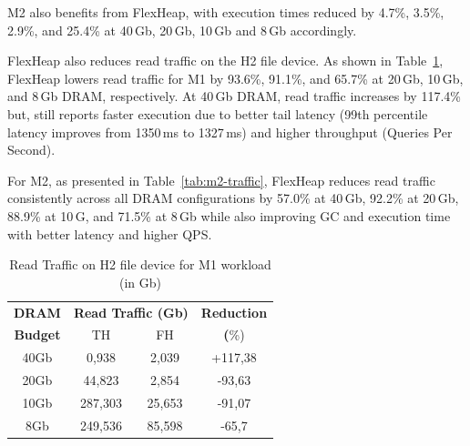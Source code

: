 M2 also benefits from FlexHeap, with execution times reduced 
by 4.7\%, 3.5\%, 2.9\%, and 25.4\% at 40\,Gb, 20\,Gb, 10\,Gb and 8\,Gb accordingly. 


FlexHeap also reduces read traffic on the H2 file device.
As shown in Table~\ref{tab:m1-traffic}, FlexHeap lowers read traffic for M1 by 93.6\%, 
91.1\%, and 65.7\% at 20\,Gb, 10\,Gb, and 8\,Gb DRAM, respectively. At 40\,Gb DRAM, read traffic increases 
by 117.4\% but, still reports faster execution due to better tail 
latency (99th percentile latency improves from 1350\,ms to 1327\,ms) and higher throughput (Queries Per Second).

For M2, as presented in Table~\ref{tab:m2-traffic}, FlexHeap reduces read traffic consistently across all DRAM configurations by 57.0\% at 40\,Gb, 
92.2\% at 20\,Gb, 88.9\% at 10\,G, and 71.5\% at 8\,Gb while also improving GC and execution time with better latency and higher QPS. 


\begin{table}[h]
\centering
\caption{Read Traffic on H2 file device for M1 workload (in Gb)}
\label{tab:m1-traffic}
\begin{tabular}{|c|cc|c|}
\hline

\textbf{DRAM} & \multicolumn{2}{c|}{\textbf{Read Traffic (Gb)}} & \textbf{Reduction} \\
\textbf{Budget} & TH & FH & \textbf(\%)\\
\hline
40Gb & 0,938 & 2,039 & +117,38 \\
20Gb & 44,823 & 2,854 & -93,63 \\
10Gb & 287,303 & 25,653 & -91,07 \\
8Gb  & 249,536 & 85,598 & -65,7 \\
\hline
\end{tabular}
\end{table}
%


